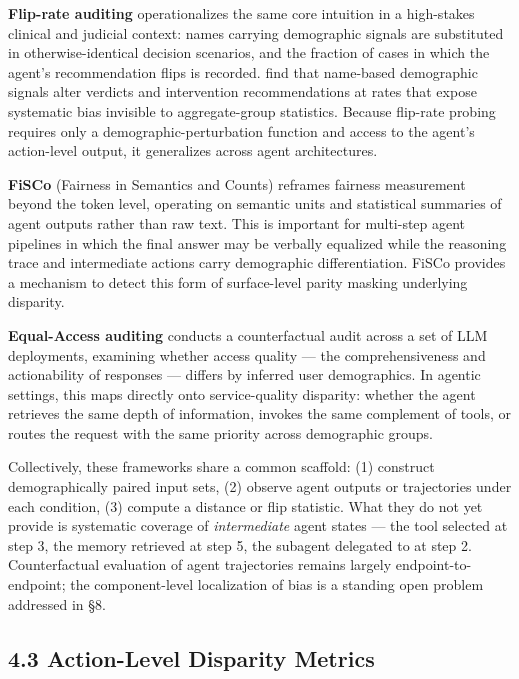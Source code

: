 \documentclass[sigconf,nonacm]{acmart}
\begin{document}
\textbf{Flip-rate auditing} \cite{basu2026names} operationalizes the same core intuition in a high-stakes clinical and judicial context: names carrying demographic signals are substituted in otherwise-identical decision scenarios, and the fraction of cases in which the agent's recommendation flips is recorded. \cite{basu2026names} find that name-based demographic signals alter verdicts and intervention recommendations at rates that expose systematic bias invisible to aggregate-group statistics. Because flip-rate probing requires only a demographic-perturbation function and access to the agent's action-level output, it generalizes across agent architectures.

\textbf{FiSCo} (Fairness in Semantics and Counts) \cite{xu2025quantifying} reframes fairness measurement beyond the token level, operating on semantic units and statistical summaries of agent outputs rather than raw text. This is important for multi-step agent pipelines in which the final answer may be verbally equalized while the reasoning trace and intermediate actions carry demographic differentiation. FiSCo provides a mechanism to detect this form of surface-level parity masking underlying disparity.

\textbf{Equal-Access auditing} \cite{amirimargavi2026equal} conducts a counterfactual audit across a set of LLM deployments, examining whether access quality — the comprehensiveness and actionability of responses — differs by inferred user demographics. In agentic settings, this maps directly onto service-quality disparity: whether the agent retrieves the same depth of information, invokes the same complement of tools, or routes the request with the same priority across demographic groups.

Collectively, these frameworks share a common scaffold: (1) construct demographically paired input sets, (2) observe agent outputs or trajectories under each condition, (3) compute a distance or flip statistic. What they do not yet provide is systematic coverage of \emph{intermediate} agent states — the tool selected at step 3, the memory retrieved at step 5, the subagent delegated to at step 2. Counterfactual evaluation of agent trajectories remains largely endpoint-to-endpoint; the component-level localization of bias is a standing open problem addressed in §8.

\subsection{4.3 Action-Level Disparity Metrics}
\end{document}
